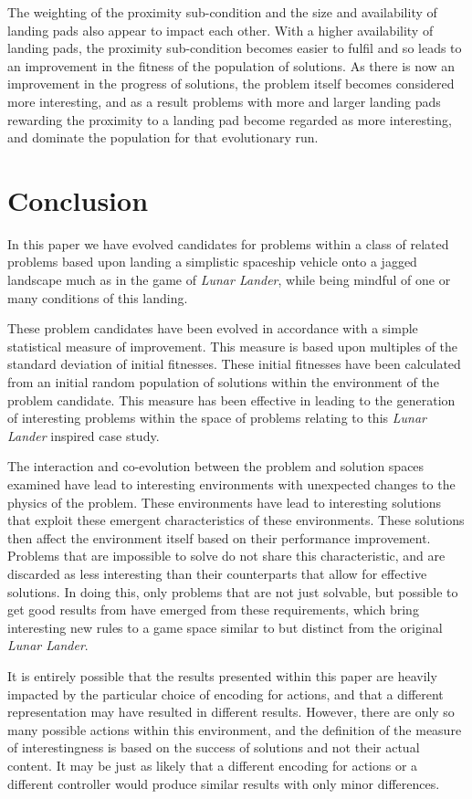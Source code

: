 \documentclass[conference]{IEEEtran}
\begin{document}
The weighting of the proximity sub-condition and the size and availability of landing pads also appear to impact each other. With a higher availability of landing pads, the proximity sub-condition becomes easier to fulfil and so leads to an improvement in the fitness of the population of solutions. As there is now an improvement in the progress of solutions, the problem itself becomes considered more interesting, and as a result problems with more and larger landing pads rewarding the proximity to a landing pad become regarded as more interesting, and dominate the population for that evolutionary run.

\section{Conclusion}

In this paper we have evolved candidates for problems within a class of related problems based upon landing a simplistic spaceship vehicle onto a jagged landscape much as in the game of {\itshape Lunar Lander}, while being mindful of one or many conditions of this landing.

These problem candidates have been evolved in accordance with a simple statistical measure of improvement. This measure is based upon multiples of the standard deviation of initial fitnesses. These initial fitnesses have been calculated from an initial random population of solutions within the environment of the problem candidate. This measure has been effective in leading to the generation of interesting problems within the space of problems relating to this {\itshape Lunar Lander} inspired case study.

The interaction and co-evolution between the problem and solution spaces examined have lead to interesting environments with unexpected changes to the physics of the problem. These environments have lead to interesting solutions that exploit these emergent characteristics of these environments. These solutions then affect the environment itself based on their performance improvement. Problems that are impossible to solve do not share this characteristic, and are discarded as less interesting than their counterparts that allow for effective solutions. In doing this, only problems that are not just solvable, but possible to get good results from have emerged from these requirements, which bring interesting new rules to a game space similar to but distinct from the original {\itshape Lunar Lander}. 

It is entirely possible that the results presented within this paper are heavily impacted by the particular choice of encoding for actions, and that a different representation may have resulted in different results. However, there are only so many possible actions within this environment, and the definition of the measure of interestingness is based on the success of solutions and not their actual content. It may be just as likely that a different encoding for actions or a different controller would produce similar results with only minor differences.
\end{document}
